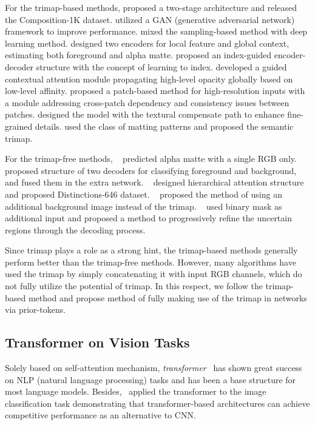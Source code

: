 \documentclass[10pt,twocolumn,letterpaper]{article}
\begin{document}
For the trimap-based methods,
\cite{xu2017deep} proposed a two-stage architecture and released the Composition-1K dataset.
\cite{lutz2018alphagan} utilized a GAN (generative adversarial network) framework to improve performance.
\cite{tang2019learning} mixed the sampling-based method with deep learning method.
\cite{hou2019context} designed two encoders for local feature and global context, estimating both foreground and alpha matte.
\cite{lu2019indices} proposed an index-guided encoder-decoder structure with the concept of learning to index.
\cite{li2020natural} developed a guided contextual attention module propagating high-level opacity globally based on low-level affinity.
\cite{yu2020high} proposed a patch-based method for high-resolution inputs with a module addressing cross-patch dependency and consistency issues between patches.
\cite{liu2021towards} designed the model with the textural compensate path to enhance fine-grained details.
\cite{sun2021semantic} used the class of matting patterns and proposed the semantic trimap.

For the trimap-free methods,
~\cite{zhang2019late, qiao2020attention} predicted alpha matte with a single RGB only.
~\cite{zhang2019late} proposed structure of two decoders for classifying foreground and background, and fused them in the extra network.
~\cite{qiao2020attention} designed hierarchical attention structure and  proposed Distinctions-646 dataset.
~\cite{sengupta2020background, lin2021real} proposed the method of using an additional background image instead of the trimap.
~\cite{yu2021mask} used binary mask as additional input and proposed a method to progressively refine the uncertain regions through the decoding process.

Since trimap plays a role as a strong hint, the trimap-based methods generally perform better than the trimap-free methods. However, many algorithms have used the trimap by simply concatenating it with input RGB channels, which do not fully utilize the potential of trimap. 
In this respect, we follow the trimap-based method and propose method of fully making use of the trimap in networks via prior-tokens.

\subsection{Transformer on Vision Tasks}

Solely based on self-attention mechanism, \textit{transformer}~\cite{vaswani2017attention} has shown great success on NLP (natural language processing) tasks and has been a base structure for most language models. Besides,~\cite{dosovitskiy2020image} applied the transformer to the image classification task demonstrating that transformer-based architectures can achieve competitive performance as an alternative to CNN. 
\end{document}
